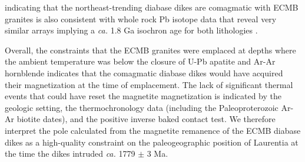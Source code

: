 \documentclass[draft]{agujournal2019}
\begin{document}
indicating that the northeast-trending diabase dikes are comagmatic with ECMB granites is also consistent with whole rock Pb isotope data that reveal very similar arrays implying a \textit{ca.} 1.8 Ga isochron age for both lithologies \cite{Horan1987a}. 


Overall, the constraints that the ECMB granites were emplaced at depths where the ambient temperature was below the closure of U-Pb apatite and Ar-Ar hornblende indicates that the comagmatic diabase dikes would have acquired their magnetization at the time of emplacement. The lack of significant thermal events that could have reset the magnetite magnetization is indicated by the geologic setting, the thermochronology data (including the Paleoproterozoic Ar-Ar biotite dates), and the positive inverse baked contact test. We therefore interpret the pole calculated from the magnetite remanence of the ECMB diabase dikes as a high-quality constraint on the paleogeographic position of Laurentia at the time the dikes intruded \textit{ca.} 1779 $\pm$ 3 Ma.
\end{document}
